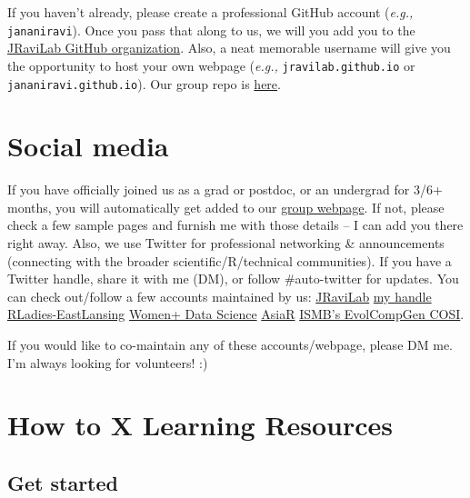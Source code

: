 \documentclass[
  letterpaper,
  DIV=11,
  numbers=noendperiod]{scrreprt}
\begin{document}
If you haven't already, please create a professional GitHub account
(\emph{e.g.,} \texttt{jananiravi}). Once you pass that along to us, we
will you add you to the \href{https://github.com/jravilab}{JRaviLab
GitHub organization}. Also, a neat memorable username will give you the
opportunity to host your own webpage (\emph{e.g.,}
\texttt{jravilab.github.io} or \texttt{jananiravi.github.io}). Our group
repo is
\href{https://github.com/JRaviLab/group/tree/master/meetings}{here}.


\hypertarget{social-media}{%
\chapter{Social media}\label{social-media}}

If you have officially joined us as a grad or postdoc, or an undergrad
for 3/6+ months, you will automatically get added to our
\href{https://jravilab.github.io/\#people}{group webpage}. If not,
please check a few sample pages and furnish me with those details -- I
can add you there right away. Also, we use Twitter for professional
networking \& announcements (connecting with the broader
scientific/R/technical communities). If you have a Twitter handle, share
it with me (DM), or follow \#auto-twitter for updates. You can check
out/follow a few accounts maintained by us:
\href{https://twitter.com/jravilab}{JRaviLab} \textbar{}
\href{https://twitter.com/janani137}{my handle} \textbar{}
\href{https://twitter.com/rladies-eastlansing}{RLadies-EastLansing}
\textbar{} \href{https://twitter.com/womenplusdata}{Women+ Data Science}
\textbar{} \href{https://twitter.com/AsiaR-comm}{AsiaR} \textbar{}
\href{https://twitter.com/EvolComp}{ISMB's EvolCompGen COSI}.

If you would like to co-maintain any of these accounts/webpage, please
DM me. I'm always looking for volunteers! :)


\hypertarget{how-to-x-learning-resources}{%
\chapter{How to X \textbar{} Learning
Resources}\label{how-to-x-learning-resources}}

\hypertarget{get-started}{%
\section{Get started}\label{get-started}}
\end{document}
